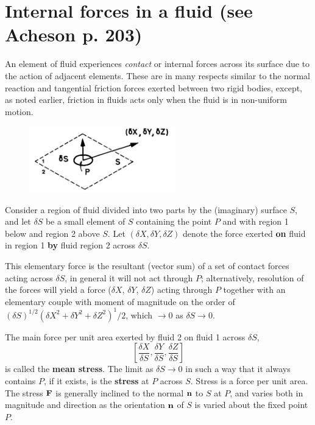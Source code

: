 \documentclass[twoside,a4paper,11pt]{report}
\begin{document}
\section{Internal forces in a fluid (see Acheson p. 203)}
An element of fluid experiences \textit{contact} or internal forces across its surface due 
to the action of adjacent elements. These are in many respects similar to 
the normal reaction and tangential friction forces exerted between two rigid 
bodies, except, as noted earlier, friction in fluids acts only when the 
fluid is in non-uniform motion.

\begin{figure}
\centerline{\includegraphics[width=2.5in]{Section22.pdf}}
\label{fig2}
\end{figure}

Consider a region of fluid divided into two parts by the (imaginary) surface 
$S$, and let $\delta S$ be a small element of $S$ containing the point $P$ and 
with region 1 below and region 2 above $S$. Let $(\delta X, \delta Y, 
\delta Z)$ denote the force exerted \textbf{on} fluid in region 1 
\textbf{by} fluid region 2 across $\delta S$.

This elementary force is the resultant (vector sum) of a set of contact 
forces acting across $\delta S$, in general it will not act through $P$; 
alternatively, resolution of the forces will yield a force ($\delta X$, 
$\delta Y$, $\delta Z$) acting through $P$ together with an elementary couple 
with moment of magnitude on the order of $(\delta S)^{1/2}(\delta 
X^2+\delta Y^2+\delta Z^2)^1/2$, which $\to  0$ as $\delta S \to 0$. 

The main force per unit area exerted by fluid 2 on fluid 1 across $\delta 
S$,
\[
\left[ {\frac{\delta X}{\delta S},\frac{\delta Y}{\delta 
S},\frac{\delta Z}{\delta S}} \right]
\]
is called the \textbf{mean stress}. The limit as $\delta S \to  0$ in such 
a way that it always contains $P$, if it exists, is the \textbf{stress} at $P$ 
across $S$. Stress is a force per unit area. The stress ${\bf F}$ is 
generally inclined to the normal ${\bf n}$ to $S$ at $P$, and varies both in 
magnitude and direction as the orientation ${\bf n}$ of $S$ is varied about 
the fixed point $P$.
\end{document}
